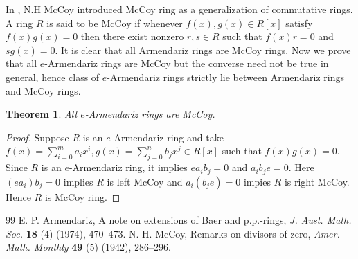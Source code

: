\documentclass[10pt,a4paper]{amsart}
\newtheorem{theorem}{Theorem}[section]
\numberwithin{equation}{section}
\begin{document}
In \cite{R}, N.H McCoy introduced McCoy ring as a generalization of commutative rings. A ring $R$ is said to be McCoy if whenever $f(x),g(x)\in R[x]$ satisfy $f(x)g(x)=0$ then there exist nonzero $r,s\in R$ such that $f(x)r=0$ and $sg(x)=0$. It is clear that all Armendariz rings are McCoy rings. Now we prove that all $e$-Armendariz rings are McCoy but the converse need not be true in general, hence class of $e$-Armendariz rings strictly lie between Armendariz rings and McCoy rings.
\begin{theorem}
	All $e$-Armendariz rings are McCoy.
\end{theorem}
\begin{proof}
	Suppose $R$ is an $e$-Armendariz ring and take $f(x)=\sum_{i=0}^{m}a_ix^i, g(x)=\sum_{j=0}^{n}b_jx^j\in R[x]$ such that $f(x)g(x)=0$. Since $R$ is an $e$-Armendariz ring, it implies $ea_ib_j=0$ and $a_ib_je=0$. Here $(ea_i)b_j=0$ implies $R$ is left McCoy and $a_i(b_je)=0$ impies $R$ is right McCoy. Hence $R$ is McCoy ring.
\end{proof}

\begin{thebibliography}{99}
 E. P. Armendariz, A note on extensions of Baer and p.p.-rings, \textit{J. Aust. Math. Soc.} \textbf{18} (4) (1974), 470–473.
 N. H. McCoy, Remarks on divisors of zero, \textit{Amer. Math. Monthly} \textbf{49} (5) (1942), 286–296.
\end{thebibliography}
\end{document}

